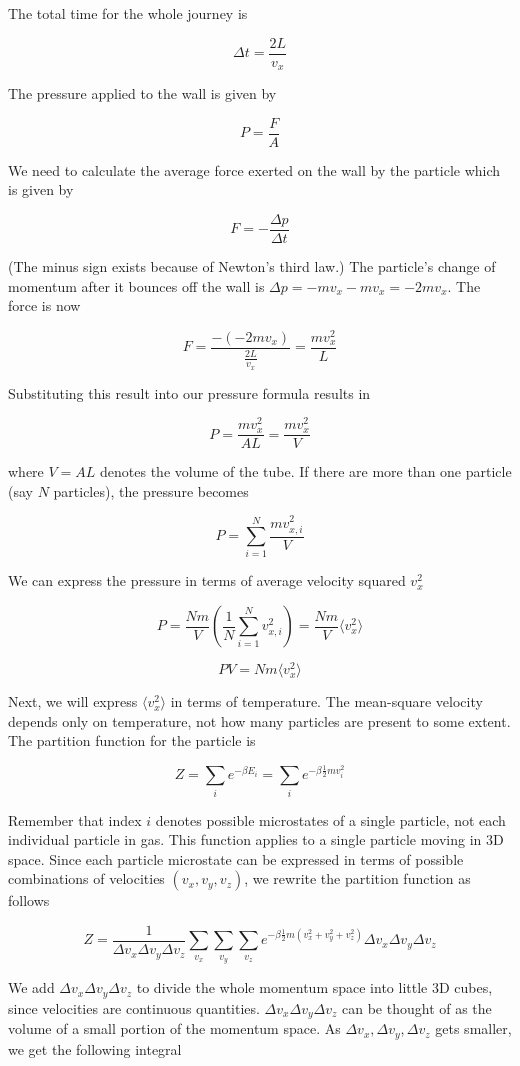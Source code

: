 The total time for the whole journey is

$$\Delta t = \frac{2L}{v_x}$$

The pressure applied to the wall is given by

$$P=\frac{F}{A}$$

We need to calculate the average force exerted on the wall by the particle which is given by

$$F=-\frac{\Delta p}{\Delta t}$$

(The minus sign exists because of Newton's third law.) The particle's change of momentum after it bounces off the wall is $\Delta p = -mv_x-mv_x=-2mv_x$. The force is now

$$F=\frac{-\left( -2mv_x \right)}{\frac{2L}{v_x}}=\frac{mv_x^2}{L}$$

Substituting this result into our pressure formula results in

$$P=\frac{mv_x^2}{AL}=\frac{mv_x^2}{V}$$

where $V=AL$ denotes the volume of the tube. If there are more than one particle (say $N$ particles), the pressure becomes

$$P=\sum_{i=1}^N \frac{mv_{x,i}^2}{V}$$

We can express the pressure in terms of average velocity squared $v_x^2$

$$P=\frac{Nm}{V} \left(\frac{1}{N} \sum_{i=1}^N v_{x,i}^2 \right) = \frac{Nm}{V} \langle v_x^2 \rangle$$

$$PV=Nm\langle v_x^2 \rangle$$

Next, we will express $\langle v_x^2 \rangle$ in terms of temperature. The mean-square velocity depends only on temperature, not how many particles are present to some extent. The partition function for the particle is

$$Z=\sum_{i} e^{-\beta E_i}=\sum_{i} e^{-\beta \frac{1}{2}mv_i^2}$$

Remember that index $i$ denotes possible microstates of a single particle, not each individual particle in gas. This function applies to a single particle moving in 3D space. Since each particle microstate can be expressed in terms of possible combinations of velocities $(v_x,v_y,v_z)$, we rewrite the partition function as follows

$$Z = \frac{1}{\Delta v_x \Delta v_y \Delta v_z} \sum_{v_x} \sum_{v_y} \sum_{v_z} e^{-\beta \frac{1}{2}m (v_x^2+v_y^2+v_z^2)} \Delta v_x \Delta v_y \Delta v_z$$

We add $\Delta v_x \Delta v_y \Delta v_z$ to divide the whole momentum space into little 3D cubes, since velocities are continuous quantities. $\Delta v_x \Delta v_y \Delta v_z$ can be thought of as the volume of a small portion of the momentum space. As $\Delta v_x, \Delta v_y, \Delta v_z$ gets smaller, we get the following integral


